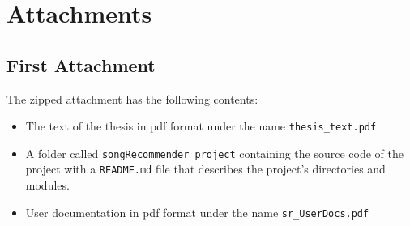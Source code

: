 \documentclass[12pt,a4paper,twoside,openright]{report}
\let\openright=\cleardoublepage
\begin{document}



\tableofcontents

% 
% 

%




%








\listoffigures

\listoftables


\appendix
\chapter{Attachments}

\section{First Attachment}\label{attach:first_attachment}

The zipped attachment has the following contents:
\begin{itemize}
    \item The text of the thesis in pdf format under the name \texttt{thesis\_text.pdf}
    \item A folder called \texttt{songRecommender\_project} containing the source code of the project with a \texttt{README.md} file that describes the project's directories and modules.
    \item User documentation in pdf format under the name \texttt{sr\_UserDocs.pdf}
\end{itemize}

\openright
\end{document}

